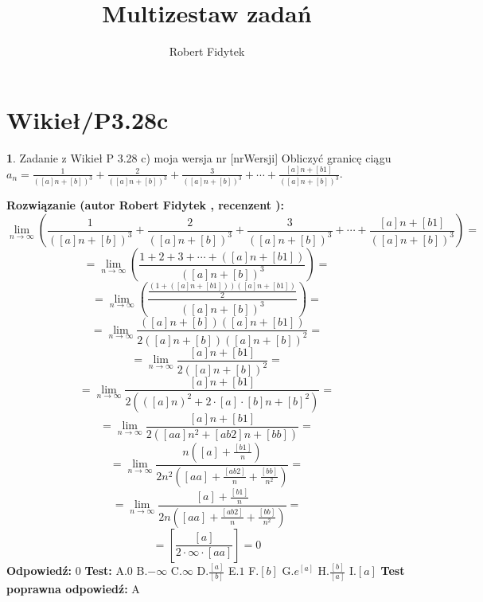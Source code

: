 \documentclass[12pt, a4paper]{article}
\title{Multizestaw zadań}
\author{Robert Fidytek}
\date{}
\theoremstyle{definition} %
\newtheorem{zad}{}
\newcommand{\kategoria}[1]{\section{#1}} %
\newcommand{\zadStart}[1]{\begin{zad}#1\newline} %
\newcommand{\zadStop}{\end{zad}}   %
\newcommand{\rozwStart}[2]{\noindent \textbf{Rozwiązanie (autor #1 , recenzent #2): }\newline} %
\newcommand{\rozwStop}{\newline}                                            %
\newcommand{\odpStart}{\noindent \textbf{Odpowiedź:}\newline}    %
\newcommand{\odpStop}{\newline}                                             %
\newcommand{\testStart}{\noindent \textbf{Test:}\newline} %
\newcommand{\testStop}{\newline} %
\newcommand{\kluczStart}{\noindent \textbf{Test poprawna odpowiedź:}\newline} %
\newcommand{\kluczStop}{\newline} %
\begin{document}
\maketitle



\kategoria{Wikieł/P3.28c}
\zadStart{Zadanie z Wikieł P 3.28 c) moja wersja nr [nrWersji]}
Obliczyć granicę ciągu $a_{n}=\frac{1}{([a]n+[b])^3}+\frac{2}{([a]n+[b])^3}+\frac{3}{([a]n+[b])^3}+\cdots+\frac{[a]n+[b1]}{([a]n+[b])^3}$.
\zadStop
\rozwStart{Robert Fidytek}{}
$$\lim\limits_{n\to\infty}\left(\frac{1}{([a]n+[b])^3}+\frac{2}{([a]n+[b])^3}+\frac{3}{([a]n+[b])^3}+\cdots+\frac{[a]n+[b1]}{([a]n+[b])^3}\right)=$$ 
$$=\lim\limits_{n\to\infty}\left(\frac{1+2+3+\cdots+([a]n+[b1])}{([a]n+[b])^3}\right)=$$ 
$$=\lim\limits_{n\to\infty}\left(\frac{\frac{(1+([a]n+[b1]))([a]n+[b1])}{2}}{([a]n+[b])^3}\right)=$$ 
$$=\lim\limits_{n\to\infty}\frac{([a]n+[b])([a]n+[b1])}{2([a]n+[b])([a]n+[b])^2}=$$ 
$$=\lim\limits_{n\to\infty}\frac{[a]n+[b1]}{2([a]n+[b])^2}=$$ 
$$=\lim\limits_{n\to\infty}\frac{[a]n+[b1]}{2\left(([a]n)^2+2\cdot[a]\cdot[b]n+[b]^2\right)}=$$ 
$$=\lim\limits_{n\to\infty}\frac{[a]n+[b1]}{2\left([aa]n^2+[ab2]n+[bb]\right)}=$$ 
$$=\lim\limits_{n\to\infty}\frac{n\left([a]+\frac{[b1]}{n}\right)}{2n^2\left([aa]+\frac{[ab2]}{n}+\frac{[bb]}{n^2}\right)}=$$ 
$$=\lim\limits_{n\to\infty}\frac{[a]+\frac{[b1]}{n}}{2n\left([aa]+\frac{[ab2]}{n}+\frac{[bb]}{n^2}\right)}=$$
$$=\left[\frac{[a]}{2\cdot\infty\cdot [aa]}\right]=0$$ 
\rozwStop
\odpStart
$0$
\odpStop
\testStart
A.$0$
B.$-\infty$
C.$\infty$
D.$\frac{[a]}{[b]}$
E.$1$
F.$[b]$
G.$e^{[a]}$
H.$\frac{[b]}{[a]}$
I.$[a]$
\testStop
\kluczStart
A
\kluczStop
\end{document}

